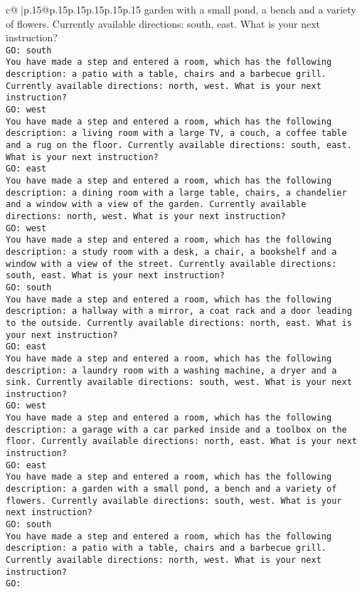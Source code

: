 \documentclass{article}
\begin{document}
{\begin{supertabular}{c@{$\;$}|p{.15\linewidth}@{}p{.15\linewidth}p{.15\linewidth}p{.15\linewidth}p{.15\linewidth}p{.15\linewidth}}
{{{garden with a small pond, a bench and a variety of flowers. Currently available directions: south, east. What is your next instruction?\\ \tt GO: south\\ \tt You have made a step and entered a room, which has the following description: a patio with a table, chairs and a barbecue grill. Currently available directions: north, west. What is your next instruction?\\ \tt GO: west\\ \tt You have made a step and entered a room, which has the following description: a living room with a large TV, a couch, a coffee table and a rug on the floor. Currently available directions: south, east. What is your next instruction?\\ \tt GO: east\\ \tt You have made a step and entered a room, which has the following description: a dining room with a large table, chairs, a chandelier and a window with a view of the garden. Currently available directions: north, west. What is your next instruction?\\ \tt GO: west\\ \tt You have made a step and entered a room, which has the following description: a study room with a desk, a chair, a bookshelf and a window with a view of the street. Currently available directions: south, east. What is your next instruction?\\ \tt GO: south\\ \tt You have made a step and entered a room, which has the following description: a hallway with a mirror, a coat rack and a door leading to the outside. Currently available directions: north, east. What is your next instruction?\\ \tt GO: east\\ \tt You have made a step and entered a room, which has the following description: a laundry room with a washing machine, a dryer and a sink. Currently available directions: south, west. What is your next instruction?\\ \tt GO: west\\ \tt You have made a step and entered a room, which has the following description: a garage with a car parked inside and a toolbox on the floor. Currently available directions: north, east. What is your next instruction?\\ \tt GO: east\\ \tt You have made a step and entered a room, which has the following description: a garden with a small pond, a bench and a variety of flowers. Currently available directions: south, west. What is your next instruction?\\ \tt GO: south\\ \tt You have made a step and entered a room, which has the following description: a patio with a table, chairs and a barbecue grill. Currently available directions: north, west. What is your next instruction?\\ \tt GO: }}}
\end{supertabular}}
\end{document}
